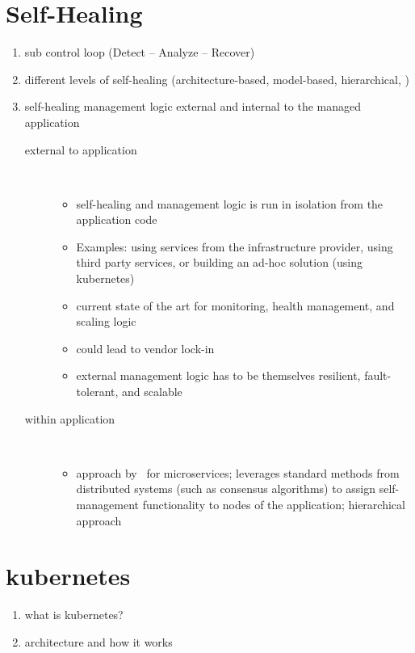 \section{Self-Healing}
  \begin{enumerate}
    \item sub control loop (Detect -- Analyze -- Recover)
    \item different levels of self-healing (architecture-based, model-based, hierarchical, \etc)
    \item self-healing management logic external and internal to the managed application
      \begin{description}
        \item[external to application]\hfill\\
          \begin{itemize}
            \item self-healing and management logic is run in isolation from the application code
            \item Examples: using services from the infrastructure provider, using third party services, or building an ad-hoc solution (\eg using \gls{kubernetes})~\cite{ToffettiMicroservices}
            \item current state of the art for monitoring, health management, and scaling logic
            \item could lead to vendor lock-in
            \item external management logic has to be themselves resilient, fault-tolerant, and scalable
          \end{itemize}
        \item[within application]\hfill\\
        \begin{itemize}
          \item approach by~\citeauthor{ToffettiMicroservices} for microservices; leverages standard methods from distributed systems (such as consensus algorithms) to assign self-management functionality to nodes of the application; hierarchical approach~\cite{ToffettiMicroservices}
        \end{itemize}
      \end{description}
  \end{enumerate}

\section[Kubernetes]{\gls{kubernetes}}
  \begin{enumerate}
    \item what is \gls{kubernetes}?
    \item architecture and how it works
  \end{enumerate}


